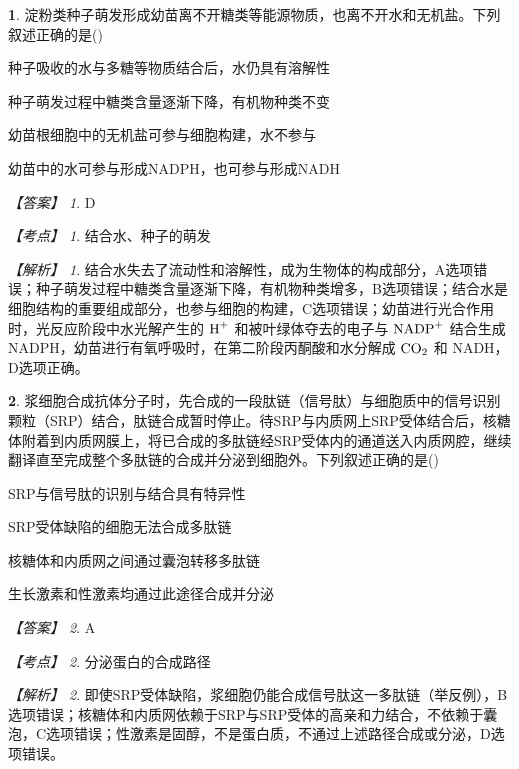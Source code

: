 \documentclass[UTF8, 10pt, a4paper, oneside]{ctexart}
\theoremstyle{definition}
\newtheorem{exercise}{}
\theoremstyle{remark}
\newtheorem*{answer}{【答案】}
\newtheorem*{point}{【考点】}      %
\newtheorem*{explanation}{【解析】}     %
\theoremstyle{plain}
\begin{document}
\begin{exercise}
    淀粉类种子萌发形成幼苗离不开糖类等能源物质，也离不开水和无机盐。下列叙述正确的是\quad(\quad)
    \begin{adjustwidth}{2em}{}
        \begin{asparaenum}[A. ]
            \item 种子吸收的水与多糖等物质结合后，水仍具有溶解性
            \item 种子萌发过程中糖类含量逐渐下降，有机物种类不变
            \item 幼苗根细胞中的无机盐可参与细胞构建，水不参与
            \item 幼苗中的水可参与形成NADPH，也可参与形成NADH
        \end{asparaenum}
    \end{adjustwidth}
    \begin{answer}
        D
    \end{answer}
    \begin{point}
        结合水、种子的萌发
    \end{point}
    \begin{explanation}
        结合水失去了流动性和溶解性，成为生物体的构成部分，A选项错误；种子萌发过程中糖类含量逐渐下降，有机物种类增多，B选项错误；结合水是细胞结构的重要组成部分，也参与细胞的构建，C选项错误；幼苗进行光合作用时，光反应阶段中水光解产生的 $\ce{H^+}$ 和被叶绿体夺去的电子与 $\ce{NADP+}$ 结合生成 NADPH，幼苗进行有氧呼吸时，在第二阶段丙酮酸和水分解成 $\ce{CO2}$ 和 NADH，D选项正确。
    \end{explanation}
\end{exercise}
\begin{exercise}
    浆细胞合成抗体分子时，先合成的一段肽链（信号肽）与细胞质中的信号识别颗粒（SRP）结合，肽链合成暂时停止。待SRP与内质网上SRP受体结合后，核糖体附着到内质网膜上，将已合成的多肽链经SRP受体内的通道送入内质网腔，继续翻译直至完成整个多肽链的合成并分泌到细胞外。下列叙述正确的是\quad(\quad)
    \begin{adjustwidth}{2em}{}
        \begin{asparaenum}[A. ]
            \item SRP与信号肽的识别与结合具有特异性
            \item SRP受体缺陷的细胞无法合成多肽链
            \item 核糖体和内质网之间通过囊泡转移多肽链
            \item 生长激素和性激素均通过此途径合成并分泌
        \end{asparaenum}
    \end{adjustwidth}
    \begin{answer}
        A
    \end{answer}
    \begin{point}
        分泌蛋白的合成路径
    \end{point}
    \begin{explanation}
        即使SRP受体缺陷，浆细胞仍能合成信号肽这一多肽链（举反例），B选项错误；核糖体和内质网依赖于SRP与SRP受体的高亲和力结合，不依赖于囊泡，C选项错误；性激素是固醇，不是蛋白质，不通过上述路径合成或分泌，D选项错误。
    \end{explanation}
\end{exercise}
\end{document}
